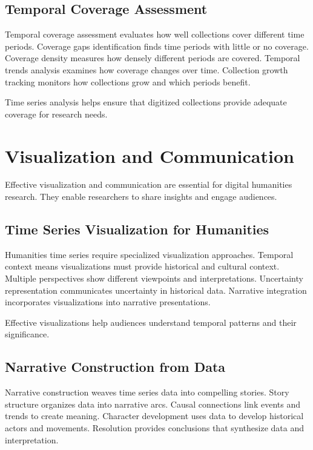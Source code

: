 \subsection{Temporal Coverage Assessment}

Temporal coverage assessment evaluates how well collections cover different time periods. Coverage gaps identification finds time periods with little or no coverage. Coverage density measures how densely different periods are covered. Temporal trends analysis examines how coverage changes over time. Collection growth tracking monitors how collections grow and which periods benefit.

Time series analysis helps ensure that digitized collections provide adequate coverage for research needs.

\section{Visualization and Communication}

Effective visualization and communication are essential for digital humanities research. They enable researchers to share insights and engage audiences.

\subsection{Time Series Visualization for Humanities}

Humanities time series require specialized visualization approaches. Temporal context means visualizations must provide historical and cultural context. Multiple perspectives show different viewpoints and interpretations. Uncertainty representation communicates uncertainty in historical data. Narrative integration incorporates visualizations into narrative presentations.

Effective visualizations help audiences understand temporal patterns and their significance.

\subsection{Narrative Construction from Data}

Narrative construction weaves time series data into compelling stories. Story structure organizes data into narrative arcs. Causal connections link events and trends to create meaning. Character development uses data to develop historical actors and movements. Resolution provides conclusions that synthesize data and interpretation.


